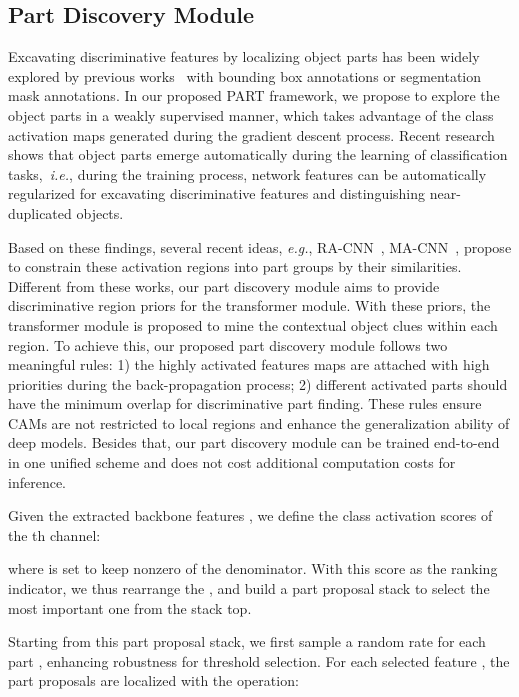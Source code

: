 \documentclass[journal]{IEEEtran}
\def\ie{{\em i.e.}}
\def\eg{{\em e.g.}}
\begin{document}
\subsection{Part Discovery Module}\label{sec:partdis}
Excavating discriminative features by localizing object parts has been widely explored by previous works~\cite{zhang2014part,huang2016part,he2017weakly,wei2018mask,he2019part,huang2020interpretable} with bounding box annotations or segmentation mask annotations. In our proposed PART framework, we propose to explore the object parts in a weakly supervised manner, which takes advantage of the class activation maps generated during the gradient descent process. Recent research~\cite{gonzalez2018semantic} shows that object parts emerge automatically during the learning of classification tasks,~\ie, during the training process, network features can be automatically regularized for excavating discriminative features and distinguishing near-duplicated objects.


Based on these findings, several recent ideas, \eg, RA-CNN~\cite{fu2017look}, MA-CNN~\cite{zheng2017learning}, propose to constrain these activation regions into part groups by their similarities. Different from these works, our part discovery module aims to provide discriminative region priors  for the transformer module. With these priors, the transformer module is proposed to mine the contextual object clues within each region. To achieve this, our proposed part discovery module follows two meaningful rules: 1) the highly activated features maps are attached with high priorities during the back-propagation process; 2) different activated parts should have the minimum overlap for discriminative part finding.  These rules ensure CAMs are not restricted to local regions and enhance the generalization ability of deep models. Besides that, our part discovery module can be trained end-to-end in one unified scheme and does not cost additional computation costs for inference.



Given the extracted backbone features , we define the class activation scores  of the th channel:

where  is set to keep nonzero of the denominator. With this score as the ranking indicator, we thus rearrange the ,  and build a part proposal stack to select the most important one from the stack top.

Starting from this part proposal stack, we first sample a random rate for each part , enhancing robustness for threshold selection. For each selected feature , the part proposals  are localized with the  operation:
\end{document}
